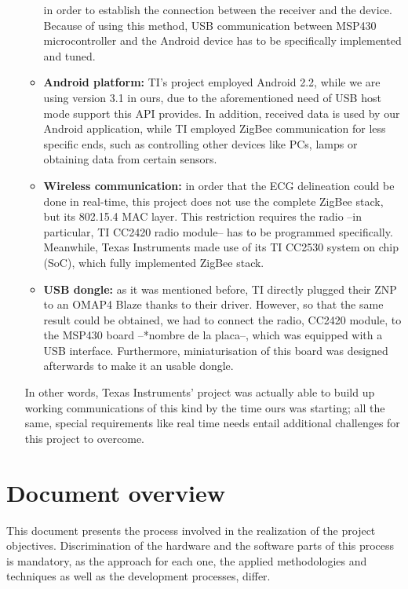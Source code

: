 \begin{itemize}
\begin{itemize}
						in order to establish the connection between the receiver and the device. Because of
						using this method, USB communication between MSP430 microcontroller and the Android
						device has to be specifically implemented and tuned.
					\item \textbf{Android platform:} TI's project employed Android 2.2, while we are using
						version	3.1 in ours, due to the aforementioned need of USB host mode support this API
						provides. In addition, received data is used by our Android application, while TI
						employed ZigBee communication for less specific ends, such as controlling other devices
						like PCs, lamps or obtaining data from certain sensors.
					\item \textbf{Wireless communication:} in order that the ECG delineation could be done in
						real-time, this project does not use the complete ZigBee stack, but its 802.15.4 MAC
						layer. This restriction requires the radio --in particular, TI CC2420 radio module-- has
						to be programmed specifically. Meanwhile, Texas Instruments made use of its TI CC2530 system on chip (SoC), which fully implemented ZigBee stack.
					\item \textbf{USB dongle:} as it was mentioned before, TI directly plugged their ZNP to an
						OMAP4 Blaze thanks to their driver. However, so that the same result could be obtained,
						we had to connect the radio, CC2420 module, to the MSP430 board --*nombre de la placa--,
						which was equipped with a USB interface. Furthermore, miniaturisation of this board was
						designed afterwards to make it an usable dongle.
				\end{itemize}
				In other words, Texas Instruments' project was actually able to build up working communications
				of this kind by the time ours was starting; all the same, special requirements like real time
				needs entail additional challenges for this project to overcome.
		\end{itemize}
	
	\section{Document overview}
	\label{sec:prj-oview}
		This document presents the process involved in the realization of the project objectives. Discrimination of the hardware and the software parts of this process is mandatory, as the approach for each one, the applied methodologies and techniques as well as the development processes, differ.\\

